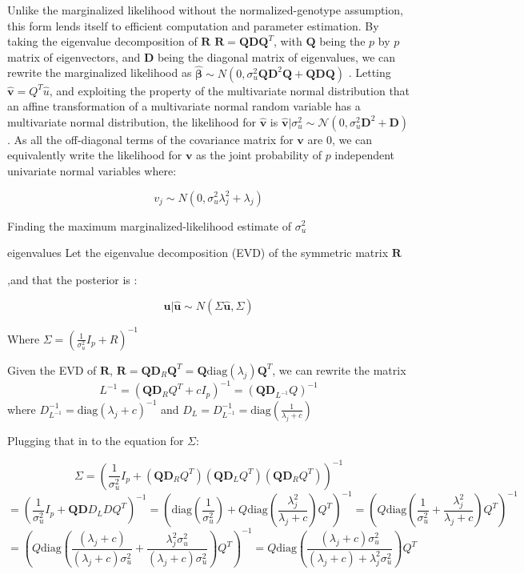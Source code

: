 Unlike the marginalized likelihood without the normalized-genotype assumption, this form lends itself to efficient computation and parameter estimation. By
taking the eigenvalue decomposition of $\textbf{R}$ $\textbf{R}=\textbf{Q}\textbf{D}\textbf{Q}^T$, with $\textbf{Q}$ 
being the $p$ by $p$ matrix of
eigenvectors, and $\textbf{D}$ being the diagonal matrix of eigenvalues, we can rewrite the marginalized likelihood as
$\hat{\boldsymbol{\beta}} \sim N(0,\sigma_u^2\textbf{QD}^2\textbf{Q}+\textbf{QDQ})$ .  Letting
$\hat{\textbf{v}} = Q^{T}\hat{u}$, and exploiting the property of
the multivariate normal distribution that an affine transformation of a multivariate normal random variable has a multivariate normal distribution, the
likelihood for $\hat{\textbf{v}}$ is $\hat{\textbf{v}}|\sigma_u^2 \sim \mathcal{N}(0,\sigma_u^2\textbf{D}^{2}+\textbf{D})$.  As all the off-diagonal terms of
the covariance matrix for ${\textbf{v}}$ are $0$, we can equivalently write the likelihood for ${\textbf{v}}$ as the joint probability of $p$ independent
univariate normal variables where:

\[ v_j \sim N(0,\sigma^2_u\lambda_j^2+\lambda_j) \]

Finding the maximum marginalized-likelihood estimate of $\sigma^2_u$

eigenvalues  Let the eigenvalue decomposition (EVD) of the symmetric matrix $\textbf{R}$

,and that the posterior is :

\[ \textbf{u}|\hat{\textbf{u}} \sim N(\Sigma \hat{\textbf{u}},\Sigma)\]

Where $\Sigma = {\left(\frac{1}{\sigma^2_u} I_p +R\right)}^{-1}$


Given the EVD of $\textbf{R}$, \(\textbf{R}=\textbf{Q}\textbf{D}_{R}\textbf{Q}^{T}=\textbf{Q} \text{diag}\left(\lambda_j\right)\textbf{Q}^{T}\), we can rewrite the matrix 
$$L^{-1}=(\textbf{Q}\textbf{D}_RQ^{T}+cI_p)^{-1}=(\textbf{Q}\textbf{D}_{L^{-1}}Q)^{-1}$$ where \(D_{L^{-1}}^{-1}=\text{diag}\left( \lambda_j+c \right)^{-1}\) and \(D_L=D_{L^{-1}}^{-1}=\text{diag}\left(\frac{1}{\lambda_j+c} \right)\)

Plugging that in to the equation for \(\Sigma\): 

$$\Sigma= \left(\frac{1}{\sigma^2_u} I_p+(\textbf{Q}\textbf{D}_RQ^{T})(\textbf{Q}\textbf{D}_LQ^{T})(\textbf{Q}\textbf{D}_RQ^{T})\right)^{-1}$$
$$=(\frac{1}{\sigma^2_u} I_p+\textbf{Q}\textbf{D}D_LDQ^{T})^{-1}= \left( \text{diag}\left(\frac{1}{\sigma_u^2}\right) + Q\text{diag}\left(\frac{\lambda_j^2}{\lambda_j+c}\right)Q^{T} \right)^{-1} = \left(Q \text{diag}\left( \frac{1}{\sigma_u^2}+\frac{\lambda_j^2}{\lambda_j+c}\right)Q^{T}\right)^{-1}$$
$$=\left(Q \text{diag}\left( \frac{(\lambda_j+c)}{(\lambda_j+c)\sigma_u^2}+\frac{\lambda_j^2\sigma_u^2}{(\lambda_j+c)\sigma_u^2}\right)Q^{T}\right)^{-1}=Q \text{diag}\left(\frac{(\lambda_j+c)\sigma_u^2}{(\lambda_j+c)+\lambda_j^2\sigma_u^2} \right)Q^{T}$$


